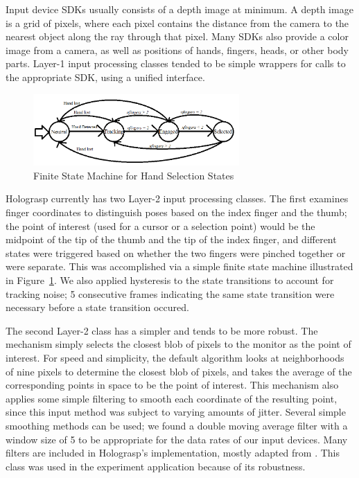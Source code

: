 \documentclass[pageno]{jpaper}
\begin{document}
Input device SDKs usually consists of a depth image at minimum. A depth image is a grid of pixels, where each
pixel contains the distance from the camera to the nearest object along the ray through that pixel. Many SDKs
also provide a color image from a camera, as well as positions of hands, fingers, heads, or other body parts.
Layer-1 input processing classes tended to be simple wrappers for calls to the appropriate SDK, using a unified
interface.

\begin{figure}
\centering
\includegraphics[width=0.7\textwidth]{figures/fsm.png}
\caption{Finite State Machine for Hand Selection States}
\label{fig:fsm}
\end{figure}
Holograsp currently has two Layer-2 input processing classes. The first examines finger coordinates to distinguish poses based
on the index finger and the thumb; the point of interest (used for a cursor or a selection point) would be the midpoint of the tip
of the thumb and the tip of the index finger, and different states were triggered based on whether the two fingers were pinched
together or were separate. This was accomplished via a simple finite state machine illustrated in Figure~\ref{fig:fsm}. We also
applied hysteresis to the state transitions to account for tracking noise; 5 consecutive frames indicating the same state transition
were necessary before a state transition occured.

The second Layer-2 class has a simpler and tends to be more robust. The mechanism simply selects the closest blob of pixels to the monitor
as the point of interest. For speed and simplicity, the default algorithm looks at neighborhoods of nine pixels to determine the closest blob of pixels,
and takes the average of the corresponding points in space to be the point of interest. This mechanism also applies some simple filtering to
smooth each coordinate of the resulting point, since this input method was subject to varying amounts of jitter. Several simple
smoothing methods can be used; we found a double moving average filter with a window size of 5 to be appropriate for the data rates of
our input devices. Many filters are included in Holograsp's implementation, mostly adapted from \cite{brown2004smoothing}. This class was
used in the experiment application because of its robustness.
\end{document}
